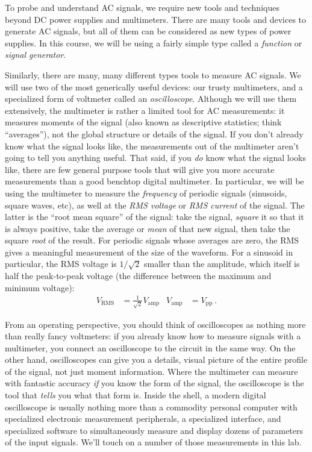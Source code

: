 \documentclass[12pt]{article}
\begin{document}
To probe and understand AC signals, we require new tools and
techniques beyond DC power supplies and multimeters.  There are many
tools and devices to generate AC signals, but all of them can be
considered as new types of power supplies.  In this course, we will be
using a fairly simple type called a \textit{function} or
\textit{signal generator}.

Similarly, there are many, many different types tools to measure AC
signals.  We will use two of the most generically useful devices: our
trusty multimeters, and a specialized form of voltmeter called an
\textit{oscilloscope}.  Although we will use them extensively, the
multimeter is rather a limited tool for AC measurements: it measures
moments of the signal (also known as descriptive statistics; think
``averages''), not the global structure or details of the signal.  If
you don't already know what the signal looks like, the measurements
out of the multimeter aren't going to tell you anything useful.  That
said, if you \textit{do} know what the signal looks like, there are
few general purpose tools that will give you more accurate
measurements than a good benchtop digital multimeter.  In particular,
we will be using the multimeter to measure the \textit{frequency} of
periodic signals (sinusoids, square waves, etc), as well at the
\textit{RMS voltage} or \textit{RMS current} of the signal.  The
latter is the ``root mean square'' of the signal: take the signal,
\textit{square} it so that it is always positive, take the average or
\textit{mean} of that new signal, then take the square \textit{root}
of the result.  For periodic signals whose averages are zero, the RMS
gives a meaningful measurement of the size of the waveform.  For a
sinusoid in particular, the RMS voltage is $1/\sqrt{2}$ smaller than
the amplitude, which itself is half the peak-to-peak voltage (the
difference between the maximum and minimum voltage):
\begin{align*}
  V_\text{RMS} &= \frac{1}{\sqrt{2}} V_\text{amp} & V_\text{amp} &= V_\text{pp}\ . 
\end{align*}

From an operating perspective, you should think of oscilloscopes as
nothing more than really fancy voltmeters: if you already know how to
measure signals with a multimeter, you connect an oscilloscope to the
circuit in the same way.  On the other hand, oscilloscopes can give
you a details, visual picture of the entire profile of the signal, not
just moment information.  Where the multimeter can measure with
fantastic accuracy \textit{if} you know the form of the signal, the
oscilloscope is the tool that \textit{tells} you what that form is.
Inside the shell, a modern digital oscilloscope is usually nothing
more than a commodity personal computer with specialized electronic
measurement peripherals, a specialized interface, and specialized
software to simultaneously measure and display dozens of parameters of
the input signals.  We'll touch on a number of those measurements in
this lab.
\end{document}
